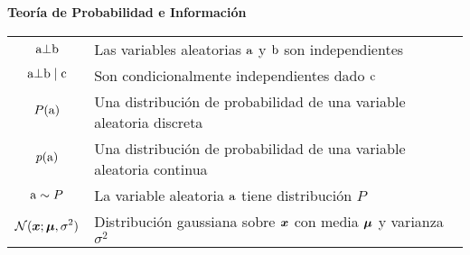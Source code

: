 \vspace{\notationgap}
\begin{minipage}{\textwidth}
\centerline{\bf Teoría de Probabilidad e Información}
\bgroup
\def\arraystretch{1.5}
\begin{tabular}{cp{}}
$\displaystyle {\textnormal{a}} \bot {\textnormal{b}}$ & Las variables aleatorias ${\textnormal{a}}$ y ${\textnormal{b}}$ son independientes\\
$\displaystyle {\textnormal{a}} \bot {\textnormal{b}} \mid {\textnormal{c}} $ & Son condicionalmente independientes dado ${\textnormal{c}}$\\
$\displaystyle P({\textnormal{a}})$ & Una distribución de probabilidad de una variable aleatoria discreta\\
$\displaystyle p({\textnormal{a}})$ & Una distribución de probabilidad de una variable aleatoria continua\\
$\displaystyle {\textnormal{a}} \sim P$ & La variable aleatoria ${\textnormal{a}}$ tiene distribución $P$\\%
$\displaystyle \mathcal{N} ( {\bm{x}} ; {\bm{\mu}} , \sigma^2)$ & Distribución gaussiana %
sobre ${\bm{x}}$ con media ${\bm{\mu}}$ y varianza $\sigma^2$ \\
\end{tabular}
\egroup
{}
\end{minipage}

